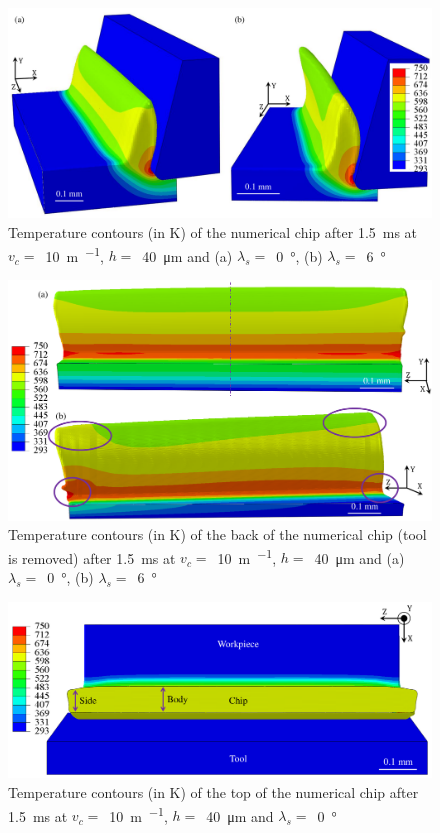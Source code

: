 \documentclass[preprint,12pt,times]{elsarticle}
\begin{document}
\begin{figure}[!h]
\centering
\includegraphics[width = 140 mm]{Figures/ChipsNum}
\caption{Temperature contours (in \unit{\K}) of the numerical chip after \qty{1.5}{\ms} at $v_c =$~\qty{10}{\m\per\min}, $h =$~\qty{40}{\um} and (a) $\lambda_s =$~\qty{0}{\degree}, (b) $\lambda_s =$~\qty{6}{\degree}}
\label{fig:ChipsNum}
\end{figure}

\begin{figure}[!h]
\centering
\includegraphics[width = 140 mm]{Figures/ChipsNumBack}
\caption{Temperature contours (in \unit{\K}) of the back of the numerical chip (tool is removed) after \qty{1.5}{\ms} at $v_c =$~\qty{10}{\m\per\min}, $h =$~\qty{40}{\um} and (a) $\lambda_s =$~\qty{0}{\degree}, (b) $\lambda_s =$~\qty{6}{\degree}}
\label{fig:ChipsNumBack}
\end{figure}

\begin{figure}[!h]
\centering
\includegraphics[width = 140 mm]{Figures/ChipNumTop}
\caption{Temperature contours (in \unit{\K}) of the top of the numerical chip after \qty{1.5}{\ms} at $v_c =$~\qty{10}{\m\per\min}, $h =$~\qty{40}{\um} and $\lambda_s =$~\qty{0}{\degree}}
\label{fig:ChipNumTop}
\end{figure}
\end{document}
